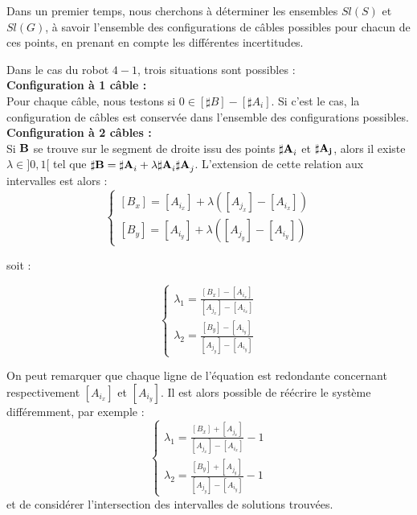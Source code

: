 Dans un premier temps, nous cherchons \`a d\'eterminer les ensembles $Sl(S)$ et 
$Sl(G)$, \`a savoir l'ensemble des configurations de c\^ables possibles pour 
chacun de ces points, en prenant en compte les diff\'erentes incertitudes.

Dans le cas du robot $4-1$, trois situations sont possibles : \\

{\bf Configuration \`a 1 c\^able :}\\

Pour chaque c\^able, nous testons si $0 \in [\sharp B] - [\sharp A_i]$. Si 
c'est le cas, la configuration de c\^ables est conserv\'ee dans l'ensemble des 
configurations possibles.\\

{\bf Configuration \`a 2 c\^ables :}\\

Si ${\bf B}$ se trouve sur le segment de droite issu des points ${\bf 
\sharp A}_i$ et ${\bf \sharp A_j}$, alors il existe $\lambda \in ]0,1[$ tel que 
${\bf \sharp B} = {\bf \sharp A}_i + \lambda {\bf \sharp 
A}_i{\bf \sharp A}_j$.
L'extension de cette relation aux intervalles est alors :
\begin{equation}
\left \lbrace
\begin{matrix}
[B_x] = [A_{i_x}] + \lambda ([A_{j_x}] - [A_{i_x}]) \\
[B_y] = [A_{i_y}] + \lambda ([A_{j_y}] - [A_{i_y}])
\end{matrix}
\right .
\label{chap03:eq15}
\end{equation}

soit :

\begin{equation}
\left \lbrace
\begin{matrix}
\lambda_1 = \frac {[B_x] - [A_{i_x}]} {[A_{j_x}] - [A_{i_x}]}\\
\lambda_2 = \frac {[B_y] - [A_{i_y}]} {[A_{j_y}] - [A_{i_y}]}
\end{matrix}
\right .
\label{chap03:eq16}
\end{equation}

On peut remarquer que chaque ligne de l'\'equation est redondante concernant 
respectivement $[A_{i_x}]$ et $[A_{i_y}]$. Il est alors possible de 
r\'e\'ecrire le syst\`eme diff\'eremment, par exemple :
\begin{equation}
\left \lbrace
\begin{matrix}
\lambda_1 = \frac {[B_x] + [A_{j_x}]} {[A_{j_x}] - [A_{i_x}]} - 1\\
\lambda_2 = \frac {[B_y] + [A_{j_y}]} {[A_{j_y}] - [A_{i_y}]} - 1
\end{matrix}
\right .
\label{chap03:eq16}
\end{equation}
et de consid\'erer l'intersection des intervalles de solutions trouv\'ees.

